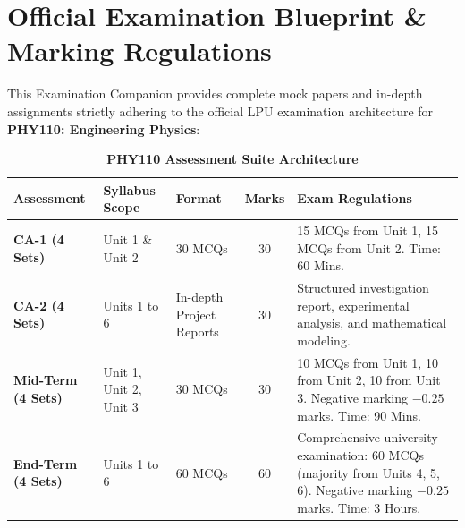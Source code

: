 \chapter*{Official Examination Blueprint \& Marking Regulations}

This Examination Companion provides complete mock papers and in-depth assignments strictly adhering to the official LPU examination architecture for \textbf{PHY110: Engineering Physics}:

\begin{table}[htbp]
\centering
\caption{\textbf{PHY110 Assessment Suite Architecture}}
\vspace{2mm}
\begin{tabularx}{\textwidth}{l p{3.2cm} p{2.8cm} c X}
\toprule
\textbf{Assessment} & \textbf{Syllabus Scope} & \textbf{Format} & \textbf{Marks} & \textbf{Exam Regulations} \\
\midrule
\textbf{CA-1 (4 Sets)} & Unit 1 \& Unit 2 & 30 MCQs & 30 & 15 MCQs from Unit 1, 15 MCQs from Unit 2. Time: 60 Mins. \\
\addlinespace
\textbf{CA-2 (4 Sets)} & Units 1 to 6 & In-depth Project Reports & 30 & Structured investigation report, experimental analysis, and mathematical modeling. \\
\addlinespace
\textbf{Mid-Term (4 Sets)} & Unit 1, Unit 2, Unit 3 & 30 MCQs & 30 & 10 MCQs from Unit 1, 10 from Unit 2, 10 from Unit 3. Negative marking $-0.25$ marks. Time: 90 Mins. \\
\addlinespace
\textbf{End-Term (4 Sets)} & Units 1 to 6 & 60 MCQs & 60 & Comprehensive university examination: 60 MCQs (majority from Units 4, 5, 6). Negative marking $-0.25$ marks. Time: 3 Hours. \\
\bottomrule
\end{tabularx}
\end{table}

\newpage
